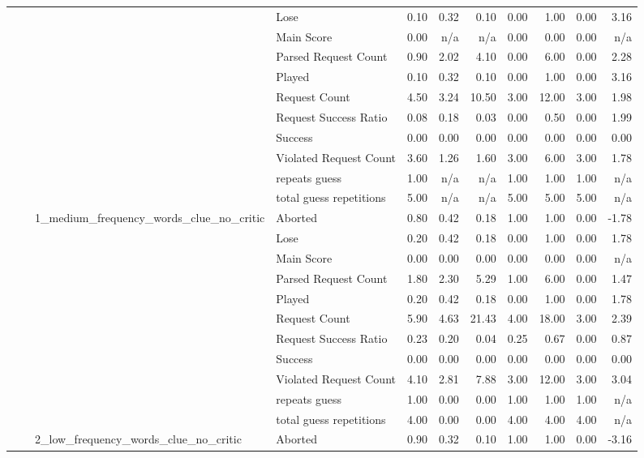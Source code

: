 \begin{tabular}{llllrrrrrrr}
 &  &  & Lose & 0.10 & 0.32 & 0.10 & 0.00 & 1.00 & 0.00 & 3.16 \\
 &  &  & Main Score & 0.00 & n/a & n/a & 0.00 & 0.00 & 0.00 & n/a \\
 &  &  & Parsed Request Count & 0.90 & 2.02 & 4.10 & 0.00 & 6.00 & 0.00 & 2.28 \\
 &  &  & Played & 0.10 & 0.32 & 0.10 & 0.00 & 1.00 & 0.00 & 3.16 \\
 &  &  & Request Count & 4.50 & 3.24 & 10.50 & 3.00 & 12.00 & 3.00 & 1.98 \\
 &  &  & Request Success Ratio & 0.08 & 0.18 & 0.03 & 0.00 & 0.50 & 0.00 & 1.99 \\
 &  &  & Success & 0.00 & 0.00 & 0.00 & 0.00 & 0.00 & 0.00 & 0.00 \\
 &  &  & Violated Request Count & 3.60 & 1.26 & 1.60 & 3.00 & 6.00 & 3.00 & 1.78 \\
 &  &  & repeats guess & 1.00 & n/a & n/a & 1.00 & 1.00 & 1.00 & n/a \\
 &  &  & total guess repetitions & 5.00 & n/a & n/a & 5.00 & 5.00 & 5.00 & n/a \\
\cline{3-11}
 &  & \multirow[t]{11}{*}{1_medium_frequency_words_clue_no_critic} & Aborted & 0.80 & 0.42 & 0.18 & 1.00 & 1.00 & 0.00 & -1.78 \\
 &  &  & Lose & 0.20 & 0.42 & 0.18 & 0.00 & 1.00 & 0.00 & 1.78 \\
 &  &  & Main Score & 0.00 & 0.00 & 0.00 & 0.00 & 0.00 & 0.00 & n/a \\
 &  &  & Parsed Request Count & 1.80 & 2.30 & 5.29 & 1.00 & 6.00 & 0.00 & 1.47 \\
 &  &  & Played & 0.20 & 0.42 & 0.18 & 0.00 & 1.00 & 0.00 & 1.78 \\
 &  &  & Request Count & 5.90 & 4.63 & 21.43 & 4.00 & 18.00 & 3.00 & 2.39 \\
 &  &  & Request Success Ratio & 0.23 & 0.20 & 0.04 & 0.25 & 0.67 & 0.00 & 0.87 \\
 &  &  & Success & 0.00 & 0.00 & 0.00 & 0.00 & 0.00 & 0.00 & 0.00 \\
 &  &  & Violated Request Count & 4.10 & 2.81 & 7.88 & 3.00 & 12.00 & 3.00 & 3.04 \\
 &  &  & repeats guess & 1.00 & 0.00 & 0.00 & 1.00 & 1.00 & 1.00 & n/a \\
 &  &  & total guess repetitions & 4.00 & 0.00 & 0.00 & 4.00 & 4.00 & 4.00 & n/a \\
\cline{3-11}
 &  & \multirow[t]{11}{*}{2_low_frequency_words_clue_no_critic} & Aborted & 0.90 & 0.32 & 0.10 & 1.00 & 1.00 & 0.00 & -3.16 \\

\end{tabular}

